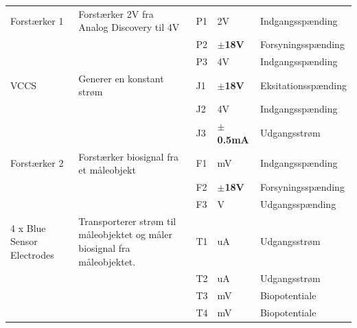 \begin{table} [H]
\begin{tabular}  {|p{3cm}|p{4cm}|p{1cm}|p{1.5cm}|p{3.8cm}| }
	 
	 
 Forstærker 1 & Forstærker 2V fra Analog Discovery til 4V   &  P1 & 2V & Indgangsspænding   \\ \cline{3-5}
	 &  & P2 & $ \pm  $\textbf{18V}  & Forsyningsspænding \\ \cline{3-5}
	 &  & P3 & 4V  & Indgangsspænding   \\ \hline
	 
	 
	 	
	 
	 
VCCS  & Generer en konstant strøm &  J1 & $ \pm  $\textbf{18V} & Eksitationsspænding    \\ \cline{3-5}
	 &  & J2 & 4V  & Indgangsspænding \\ \cline{3-5}
	 &  & J3 & $ \pm  $\textbf{0.5mA}  & Udgangsstrøm   \\ \hline



 
	 
	 
 Forstærker 2 & Forstærker biosignal fra et måleobjekt   &  F1 & mV & Indgangsspænding     \\ \cline{3-5}
	 &  & F2 & $ \pm  $\textbf{18V}  & Forsyningsspænding \\ \cline{3-5}
	 &  & F3 & V  & Udgangsspænding   \\ \hline
	 
	 
4 x Blue Sensor Electrodes & Transporterer strøm til måleobjektet og måler biosignal fra måleobjektet.  &  T1 & uA & Udgangsstrøm  \\ \cline{3-5}
	 &  & T2 & uA & Udgangsstrøm \\ \cline{3-5} 
	 &  & T3 & mV & Biopotentiale \\ \cline{3-5} 
	 &  & T4 & mV & Biopotentiale \\ \cline{3-5}  \hline
	 
 \end{tabular}
 
\end{table}

\pagebreak

